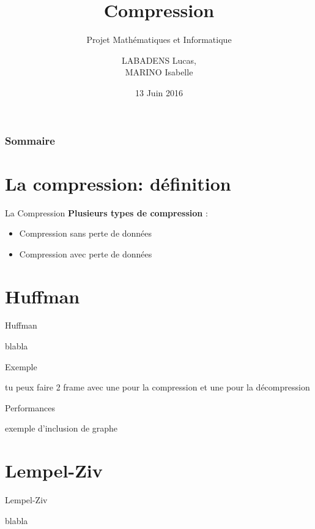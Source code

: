\documentclass[french]{beamer}
\title{Compression}
\subtitle{Projet Mathématiques et Informatique}
\author[]{LABADENS Lucas, \\ MARINO Isabelle}
\date{13 Juin 2016}
\institute[L3 S6-- Informatique]{Université Paris 7 Diderot}
\begin{document}
\begin{frame}
	\titlepage
\end{frame}

\begin{frame}
	\frametitle{Sommaire}
	\tableofcontents	
\end{frame}

\section{La compression: définition }
\begin{frame}{La Compression}
	\textbf{Plusieurs types de compression} :
	\begin{itemize}
	\item<2-3>  Compression sans perte de données
	\item<3>  Compression avec perte de données
	\end{itemize}
\end{frame}

\section{Huffman}
\begin{frame}{Huffman}
	\begin{center}
	blabla
	\end{center}
\end{frame}


\begin{frame}{Exemple}
	\begin{center}
tu peux faire 2 frame avec une pour la compression et une pour la décompression 
	\end{center}
\end{frame}

\begin{frame}{Performances}
	\begin{center}
	exemple d'inclusion de graphe 
	\end{center}
\end{frame}

\section{Lempel-Ziv}
\begin{frame}{Lempel-Ziv}
	\begin{center}
	blabla
	\end{center}
\end{frame}
\end{document}
